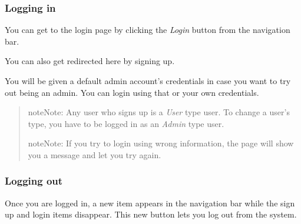 \documentclass[a4paper,10pt,english]{sphinxmanual}
\begin{document}
\subsubsection{Logging in}
\label{user/member4:logging-in}
You can get to the login page by clicking the \emph{Login} button from the navigation bar.
\begin{quote}

\end{quote}

You can also get redirected here by signing up.

You will be given a default admin account's credentials in case you want to try out being an admin. You can login using that or your own credentials.
\begin{quote}

\begin{notice}{note}{Note:}
Any user who signs up is a \emph{User} type user. To change a user's type, you have to be logged in as an \emph{Admin} type user.
\end{notice}


\begin{notice}{note}{Note:}
If you try to login using wrong information, the page will show you a message and let you try again.
\end{notice}
\end{quote}


\subsubsection{Logging out}
\label{user/member4:logging-out}
Once you are logged in, a new item appears in the navigation bar while the sign up and login items disappear. This new button lets you log out from the system.
\begin{quote}

\end{quote}
\end{document}
